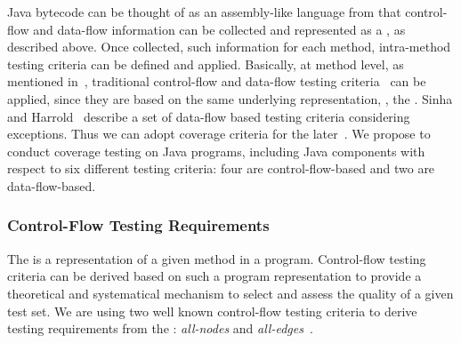 Java bytecode can be thought of as an assembly-like language from
that control-flow and data-flow information can be collected and
represented as a \BG, as described above. Once collected, such
information for each method, intra-method testing criteria can be
defined and applied. Basically, at method level, as mentioned
in~\cite{Harrold94PDFT}, traditional control-flow and data-flow
testing criteria~\cite{Rapps85SSTD} can be applied, since they are
based on the same underlying representation, \ie, the \BG. Sinha
and Harrold~\cite{Sinha99CTEH} describe a set of data-flow based
testing criteria considering exceptions. Thus we can adopt
coverage criteria for the later~\cite{Rapps85SSTD,Sinha99CTEH}. We
propose to conduct coverage testing on Java programs, including
Java components with respect to six different testing criteria:
four are control-flow-based and two are data-flow-based.

\subsubsection{Control-Flow Testing
Requirements}\label{sec:ctrl-requirements}

The \BG is a representation of a given method in a program.
Control-flow testing criteria can be derived based on such a
program representation to provide a theoretical and systematical
mechanism to select and assess the quality of a given test set. We
are using two well known control-flow testing criteria to derive
testing requirements from the \BG: \emph{all-nodes} and
\emph{all-edges}~\cite{Roper94STES}.

